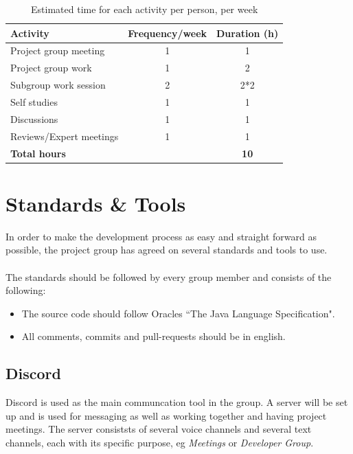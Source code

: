 \documentclass{article}
\begin{document}
        \begin{table}[h]
            \centering
            \begin{tabular}{|l|c|c|}
                \hline
                    \textbf{Activity} & \textbf{Frequency/week} & \textbf{Duration (h)} \\
                \hline
                    Project group meeting & 1 & 1 \\
                 \hline
                    Project group work & 1 & 2 \\
                 \hline
                    Subgroup work session & 2 & 2*2 \\
                 \hline
                    Self studies & 1  & 1 \\
                 \hline
                    Discussions & 1 & 1 \\
                 \hline
                    Reviews/Expert meetings & 1 & 1 \\
                 \hline
                    \textbf{Total hours} & & \textbf{10} \\
                 \hline
            \end{tabular}
            \caption{Estimated time for each activity per person, per week}
            \label{activitytable}
        \end{table}
    

\section{Standards \& Tools}    %
    In order to make the development process as easy and straight forward as possible,
    the project group has agreed on several standards and tools to use. 
    \\ \\
    The standards should be followed by every group member and consists of the following:
    \begin{itemize}
        \item The source code should follow Oracles ``The Java Language Specification".
        \item All comments, commits and pull-requests should be in english.
    \end{itemize}
    
    \subsection{Discord}
    Discord is used as the main communcation tool in the group. A server will be set up and is
    used for messaging as well as working together and having project meetings.
    The server consiststs of several voice channels and several text channels, each
    with its specific purpose, eg \textit{Meetings} or \textit{Developer Group}.
    
\end{document}
